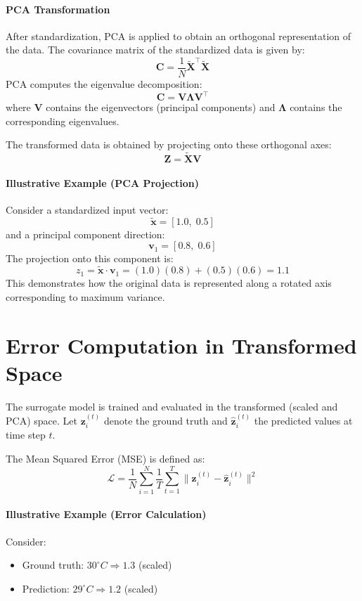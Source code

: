 \paragraph{PCA Transformation}
After standardization, PCA is applied to obtain an orthogonal representation of the data. The covariance matrix of the standardized data is given by:
\[
\mathbf{C} = \frac{1}{N} \tilde{\mathbf{X}}^\top \tilde{\mathbf{X}}
\]
PCA computes the eigenvalue decomposition:
\[
\mathbf{C} = \mathbf{V} \mathbf{\Lambda} \mathbf{V}^\top
\]
where \( \mathbf{V} \) contains the eigenvectors (principal components) and \( \mathbf{\Lambda} \) contains the corresponding eigenvalues.

The transformed data is obtained by projecting onto these orthogonal axes:
\[
\mathbf{Z} = \tilde{\mathbf{X}} \mathbf{V}
\]

\paragraph{Illustrative Example (PCA Projection)}
Consider a standardized input vector:
\[
\tilde{\mathbf{x}} = [1.0,\; 0.5]
\]
and a principal component direction:
\[
\mathbf{v}_1 = [0.8,\; 0.6]
\]
The projection onto this component is:
\[
z_1 = \tilde{\mathbf{x}} \cdot \mathbf{v}_1 = (1.0)(0.8) + (0.5)(0.6) = 1.1
\]
This demonstrates how the original data is represented along a rotated axis corresponding to maximum variance.

\section{Error Computation in Transformed Space}

The surrogate model is trained and evaluated in the transformed (scaled and PCA) space. Let \( \mathbf{z}_i^{(t)} \) denote the ground truth and \( \hat{\mathbf{z}}_i^{(t)} \) the predicted values at time step \( t \).

The Mean Squared Error (MSE) is defined as:
\[
\mathcal{L} = \frac{1}{N} \sum_{i=1}^{N} \frac{1}{T} \sum_{t=1}^{T}
\| \mathbf{z}_i^{(t)} - \hat{\mathbf{z}}_i^{(t)} \|^2
\]

\paragraph{Illustrative Example (Error Calculation)}
Consider:
\begin{itemize}
    \item Ground truth: \( 30^\circ C \Rightarrow 1.3 \) (scaled)
    \item Prediction: \( 29^\circ C \Rightarrow 1.2 \) (scaled)
\end{itemize}

